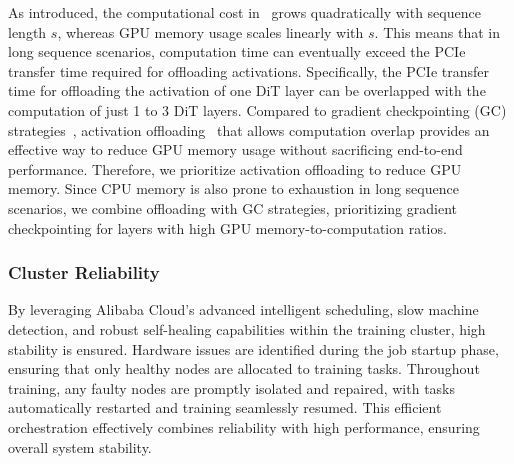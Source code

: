 As introduced, the computational cost in \method~grows quadratically with sequence length $s$, whereas GPU memory usage scales linearly with $s$. This means that in long sequence scenarios, computation time can eventually exceed the PCIe transfer time required for offloading activations. Specifically, the PCIe transfer time for offloading the activation of one DiT layer can be overlapped with the computation of just 1 to 3 DiT layers. Compared to gradient checkpointing (GC) strategies~\citep{chen2016training}, activation offloading~\citep{rhu2016vdnn} that allows computation overlap provides an effective way to reduce GPU memory usage without sacrificing end-to-end performance. Therefore, we prioritize activation offloading to reduce GPU memory.
Since CPU memory is also prone to exhaustion in long sequence scenarios, we combine offloading with GC strategies, prioritizing gradient checkpointing for layers with high GPU memory-to-computation ratios.

\subsubsection{Cluster Reliability}

By leveraging Alibaba Cloud's advanced intelligent scheduling, slow machine detection, and robust self-healing capabilities within the training cluster, high stability is ensured. Hardware issues are identified during the job startup phase, ensuring that only healthy nodes are allocated to training tasks.
Throughout training, any faulty nodes are promptly isolated and repaired, with tasks automatically restarted and training seamlessly resumed.
This efficient orchestration effectively combines reliability with high performance, ensuring overall system stability.